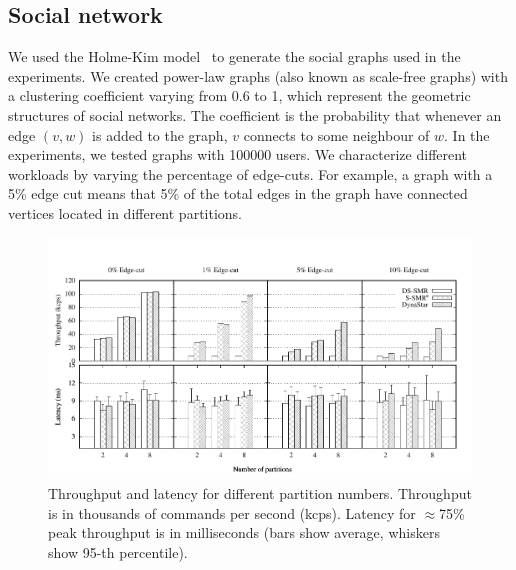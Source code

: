 \subsection{Social network}

We used the Holme-Kim model~\cite{holme-kim} to generate the social 
graphs used in the experiments. We created power-law graphs (also
known as scale-free graphs) with a clustering coefficient varying from
0.6 to 1, which represent the geometric structures of social
networks. The coefficient is the probability that whenever an edge
$(v, w)$ is added to the graph, $v$ connects to some neighbour of $w$.
In the experiments, we tested graphs with 100000 users. We characterize
different workloads by varying the percentage of edge-cuts.  For
example, a graph with a 5\% edge cut means that 5\% of the total edges
in the graph have connected vertices located in different partitions.



\begin{figure}[ht!]
	\includegraphics{figures/experiments/social-network-tp-lat/social-network-tp-lat}
	\caption{Throughput and latency for different partition numbers. 
  Throughput is in thousands of commands per second (kcps). 
  Latency for $\approx$75\% peak throughput is in milliseconds (bars show average, whiskers show 95-th percentile).}
	\label{fig:varying_edge_cut}
\end{figure}





